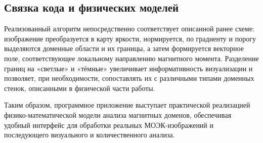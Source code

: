 \documentclass[12pt,a4paper]{article}
\numberwithin{equation}{section}
\begin{document}
\subsection{Связка кода и физических моделей}

Реализованный алгоритм непосредственно соответствует описанной ранее схеме: изображение преобразуется в карту яркости, нормируется, по градиенту и порогу выделяются доменные области и их границы, а затем формируется векторное поле, соответствующее локальному направлению магнитного момента. Разделение границ на «светлые» и «тёмные» увеличивает информативность визуализации и позволяет, при необходимости, сопоставлять их с различными типами доменных стенок, описанными в физической части работы.

Таким образом, программное приложение выступает практической реализацией физико-математической модели анализа магнитных доменов, обеспечивая удобный интерфейс для обработки реальных МОЭК-изображений и последующего визуального и количественного анализа.
\end{document}
